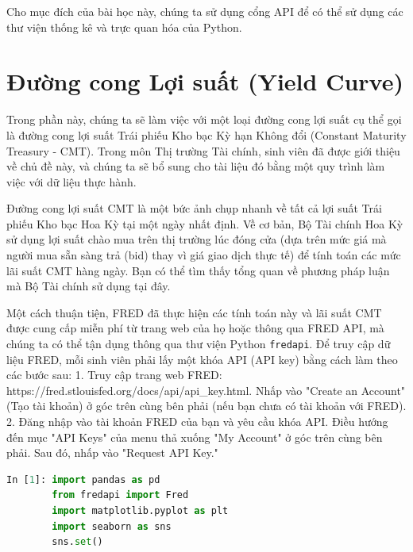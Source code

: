 Cho mục đích của bài học này, chúng ta sử dụng cổng API để có thể sử dụng các thư viện thống kê và trực quan hóa của Python.

\section[Đường cong Lợi suất]{Đường cong Lợi suất (Yield Curve)}

Trong phần này, chúng ta sẽ làm việc với một loại đường cong lợi suất cụ thể gọi là đường cong lợi suất Trái phiếu Kho bạc Kỳ hạn Không đổi (Constant Maturity Treasury - CMT). Trong môn Thị trường Tài chính, sinh viên đã được giới thiệu về chủ đề này, và chúng ta sẽ bổ sung cho tài liệu đó bằng một quy trình làm việc với dữ liệu thực hành.

Đường cong lợi suất CMT là một bức ảnh chụp nhanh về tất cả lợi suất Trái phiếu Kho bạc Hoa Kỳ tại một ngày nhất định. Về cơ bản, Bộ Tài chính Hoa Kỳ sử dụng lợi suất chào mua trên thị trường lúc đóng cửa (dựa trên mức giá mà người mua sẵn sàng trả (bid) thay vì giá giao dịch thực tế) để tính toán các mức lãi suất CMT hàng ngày. Bạn có thể tìm thấy tổng quan về phương pháp luận mà Bộ Tài chính sử dụng tại đây.

Một cách thuận tiện, FRED đã thực hiện các tính toán này và lãi suất CMT được cung cấp miễn phí từ trang web của họ hoặc thông qua FRED API, mà chúng ta có thể tận dụng thông qua thư viện Python \texttt{fredapi}. Để truy cập dữ liệu FRED, mỗi sinh viên phải lấy một khóa API (API key) bằng cách làm theo các bước sau:
1. Truy cập trang web FRED: https://fred.stlouisfed.org/docs/api/api\_key.html. Nhấp vào "Create an Account" (Tạo tài khoản) ở góc trên cùng bên phải (nếu bạn chưa có tài khoản với FRED).
2. Đăng nhập vào tài khoản FRED của bạn và yêu cầu khóa API. Điều hướng đến mục "API Keys" của menu thả xuống "My Account" ở góc trên cùng bên phải. Sau đó, nhấp vào "Request API Key."

\begin{lstlisting}[language=Python]
In [1]: import pandas as pd
        from fredapi import Fred
        import matplotlib.pyplot as plt
        import seaborn as sns
        sns.set()
\end{lstlisting}

